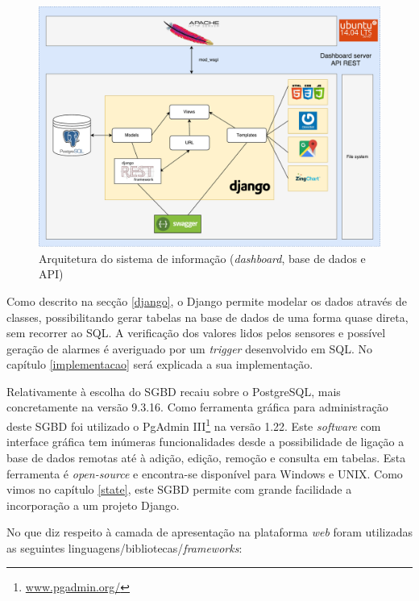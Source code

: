 \begin{figure}[h]
	\centering
	\includegraphics[width=\linewidth]{esquemas/fisica-si.pdf}
	\caption{Arquitetura do sistema de informação (\textit{dashboard}, base de dados e API)}
	\label{arquiteturasi}
\end{figure}

Como descrito na secção \ref{django}, o Django permite modelar os dados através de classes, possibilitando gerar tabelas na base de dados de uma forma quase direta, sem recorrer ao \ac{SQL}. A verificação dos valores lidos pelos sensores e possível geração de alarmes é averiguado por um \textit{trigger} desenvolvido em \ac{SQL}. No capítulo \ref{implementacao} será explicada a sua implementação.  

Relativamente à escolha do \ac{SGBD} recaiu sobre o PostgreSQL, mais concretamente na versão 9.3.16. Como ferramenta gráfica para administração deste \ac{SGBD} foi utilizado o PgAdmin III\footnote{\url{www.pgadmin.org/}} na versão 1.22. Este \textit{software} com interface gráfica tem inúmeras funcionalidades desde a possibilidade de ligação a base de dados remotas até à adição, edição, remoção e consulta em tabelas. Esta ferramenta é \textit{open-source} e encontra-se disponível para Windows e UNIX. Como vimos no capítulo \ref{state}, este \ac{SGBD} permite com grande facilidade a incorporação a um projeto Django. 


No que diz respeito à camada de apresentação na plataforma \textit{web} foram utilizadas as seguintes linguagens/bibliotecas/\textit{frameworks}: 

